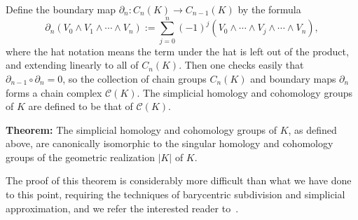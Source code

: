 \documentclass[12pt]{article}
\begin{document}
Define the boundary map $\partial_n: C_n(K) \longrightarrow
C_{n-1}(K)$ by the formula
$$
\partial_n(V_0 \wedge V_1 \wedge \cdots \wedge V_n) := \sum_{j=0}^n
(-1)^j (V_0 \wedge \cdots \wedge \hat{V_j} \wedge \cdots \wedge V_n),
$$
where the hat notation means the term under the hat is left out of the
product, and extending linearly to all of $C_n(K)$. Then one checks
easily that $\partial_{n-1} \circ \partial_n = 0$, so the collection
of chain groups $C_n(K)$ and boundary maps $\partial_n$ forms a chain
complex $\mathcal{C}(K)$. The simplicial homology and cohomology
groups of $K$ are defined to be that of $\mathcal{C}(K)$.

\textbf{Theorem:} The simplicial homology and cohomology groups of $K$,
as defined above, are canonically isomorphic to the singular homology
and cohomology groups of the geometric realization $|K|$ of $K$.

The proof of this theorem is considerably more difficult than what we
have done to this point, requiring the techniques of barycentric
subdivision and simplicial approximation, and we refer the interested
reader to~\cite{munkres}.

\begin{thebibliography}{9}
\end{thebibliography}
\end{document}

